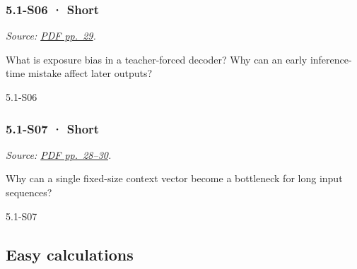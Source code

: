 \noindent\begin{minipage}{\linewidth}

\subsubsection{5.1-S06 · Short}\label{s06-short-12}

\emph{Source:
\href{../Lecture\%20Slides/5.1.\%20Sequence\%20Models.pdf\#page=29}{PDF
pp.~29}.}

What is exposure bias in a teacher-forced decoder? Why can an early
inference-time mistake affect later outputs?

\begin{solution}[20mm]{5.1-S06}

\end{solution}
\end{minipage}\par\medskip

\noindent\begin{minipage}{\linewidth}

\subsubsection{5.1-S07 · Short}\label{s07-short-12}

\emph{Source:
\href{../Lecture\%20Slides/5.1.\%20Sequence\%20Models.pdf\#page=28}{PDF
pp.~28--30}.}

Why can a single fixed-size context vector become a bottleneck for long
input sequences?

\begin{solution}[20mm]{5.1-S07}

\end{solution}
\end{minipage}\par\medskip

\subsection{Easy calculations}\label{easy-calculations-12}

